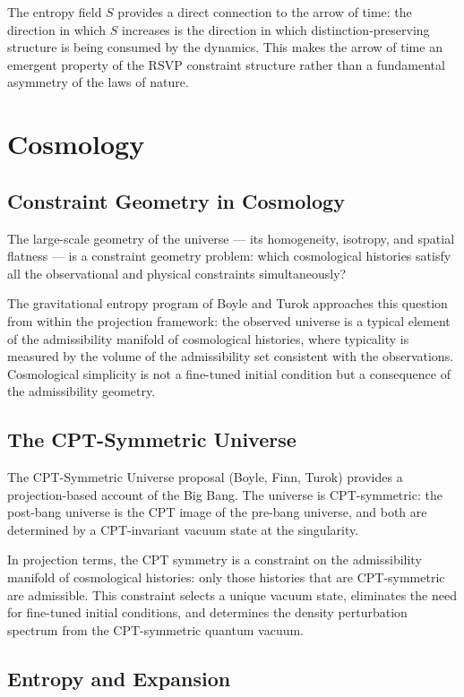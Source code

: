 \documentclass[12pt,a4paper]{book}
\theoremstyle{remark}
\theoremstyle{definition}
\begin{document}
The entropy field $S$ provides a direct connection to the arrow of time:
the direction in which $S$ increases is the direction in which
distinction-preserving structure is being consumed by the dynamics.
This makes the arrow of time an emergent property of the RSVP constraint
structure rather than a fundamental asymmetry of the laws of nature.

\chapter{Cosmology}

\section{Constraint Geometry in Cosmology}

The large-scale geometry of the universe --- its homogeneity, isotropy,
and spatial flatness --- is a constraint geometry problem: which
cosmological histories satisfy all the observational and physical
constraints simultaneously?

The gravitational entropy program of Boyle and Turok approaches this
question from within the projection framework: the observed universe is
a typical element of the admissibility manifold of cosmological histories,
where typicality is measured by the volume of the admissibility set
consistent with the observations. Cosmological simplicity is not a
fine-tuned initial condition but a consequence of the admissibility
geometry.

\section{The CPT-Symmetric Universe}

The CPT-Symmetric Universe proposal (Boyle, Finn, Turok) provides a
projection-based account of the Big Bang. The universe is CPT-symmetric:
the post-bang universe is the CPT image of the pre-bang universe, and
both are determined by a CPT-invariant vacuum state at the singularity.

In projection terms, the CPT symmetry is a constraint on the admissibility
manifold of cosmological histories: only those histories that are CPT-symmetric
are admissible. This constraint selects a unique vacuum state, eliminates
the need for fine-tuned initial conditions, and determines the density
perturbation spectrum from the CPT-symmetric quantum vacuum.

\section{Entropy and Expansion}
\end{document}
